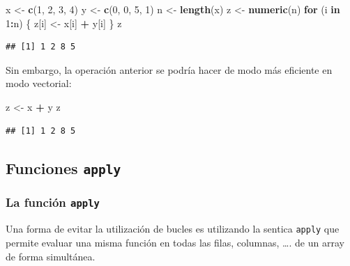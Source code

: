 \documentclass[]{book}
\newenvironment{Shaded}{\begin{snugshade}}{\end{snugshade}}
\newcommand{\ControlFlowTok}[1]{\textcolor[rgb]{0.13,0.29,0.53}{\textbf{#1}}}
\newcommand{\DecValTok}[1]{\textcolor[rgb]{0.00,0.00,0.81}{#1}}
\newcommand{\KeywordTok}[1]{\textcolor[rgb]{0.13,0.29,0.53}{\textbf{#1}}}
\newcommand{\NormalTok}[1]{#1}
\newcommand{\OperatorTok}[1]{\textcolor[rgb]{0.81,0.36,0.00}{\textbf{#1}}}
\newcommand{\StringTok}[1]{\textcolor[rgb]{0.31,0.60,0.02}{#1}}
\begin{document}
\begin{Shaded}
\begin{Highlighting}[]
\NormalTok{x <-}\StringTok{ }\KeywordTok{c}\NormalTok{(}\DecValTok{1}\NormalTok{, }\DecValTok{2}\NormalTok{, }\DecValTok{3}\NormalTok{, }\DecValTok{4}\NormalTok{)}
\NormalTok{y <-}\StringTok{ }\KeywordTok{c}\NormalTok{(}\DecValTok{0}\NormalTok{, }\DecValTok{0}\NormalTok{, }\DecValTok{5}\NormalTok{, }\DecValTok{1}\NormalTok{)}
\NormalTok{n <-}\StringTok{ }\KeywordTok{length}\NormalTok{(x)}
\NormalTok{z <-}\StringTok{ }\KeywordTok{numeric}\NormalTok{(n)}
\ControlFlowTok{for}\NormalTok{ (i }\ControlFlowTok{in} \DecValTok{1}\OperatorTok{:}\NormalTok{n) \{}
\NormalTok{  z[i] <-}\StringTok{ }\NormalTok{x[i] }\OperatorTok{+}\StringTok{ }\NormalTok{y[i]}
\NormalTok{\}}
\NormalTok{z}
\end{Highlighting}
\end{Shaded}

\begin{verbatim}
## [1] 1 2 8 5
\end{verbatim}

Sin embargo, la operación anterior se podría hacer de modo más eficiente
en modo vectorial:

\begin{Shaded}
\begin{Highlighting}[]
\NormalTok{z <-}\StringTok{ }\NormalTok{x }\OperatorTok{+}\StringTok{ }\NormalTok{y}
\NormalTok{z}
\end{Highlighting}
\end{Shaded}

\begin{verbatim}
## [1] 1 2 8 5
\end{verbatim}

\hypertarget{funciones-apply}{%
\subsection{\texorpdfstring{Funciones \texttt{apply}}{Funciones apply}}\label{funciones-apply}}

\hypertarget{la-funcion-apply}{%
\subsubsection{\texorpdfstring{La función \texttt{apply}}{La función apply}}\label{la-funcion-apply}}

Una forma de evitar la
utilización de bucles es utilizando la sentica \texttt{apply} que permite
evaluar una misma función en todas las filas, columnas, \ldots{}. de un array
de forma simultánea.
\end{document}
